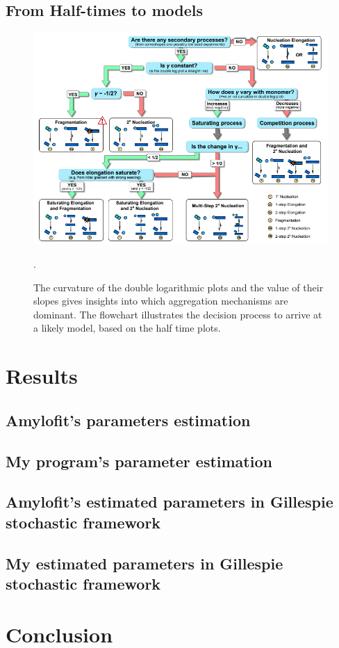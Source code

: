 \documentclass[11pt,a4paper]{article}
\begin{document}
\subsection{From Half-times to models}
\begin{figure}[H]
\centering
\includegraphics[width=1\textwidth]{Images/half_times_to_models.png}
\caption{The curvature of the double logarithmic plots and the value of their slopes gives insights into which aggregation mechanisms are dominant. The flowchart illustrates the decision process to arrive at a likely model, based on the half time plots.}
\label{fig: sample trajectory}.
\end{figure}




\section{Results}
\subsection {Amylofit's parameters estimation}

\subsection{My program's parameter estimation}

\subsection{Amylofit's estimated parameters in Gillespie stochastic framework}

\subsection{My estimated parameters in Gillespie stochastic framework}


\section{Conclusion}






\clearpage


\end{document}
